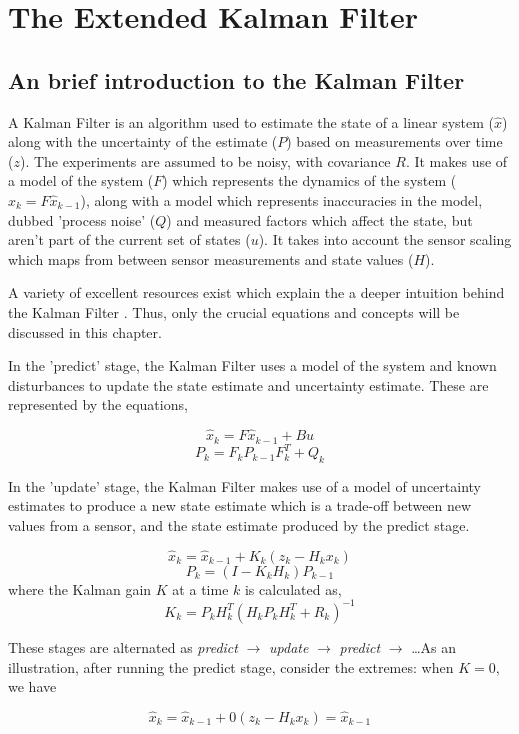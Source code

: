 \section{The Extended Kalman Filter}
\subsection{An brief introduction to the Kalman Filter}
A Kalman Filter \cite{kalman1960new} is an algorithm used to estimate the state of a linear system ($\hat{x}$) along with the uncertainty of the estimate ($P$) based on measurements over time ($z$). The experiments are assumed to be noisy, with covariance $R$. It makes use of a model of the system ($F$) which represents the dynamics of the system ($\hat{x}_{k} = F\hat{x}_{k-1}$), along with a model which represents inaccuracies in the model, dubbed 'process noise' ($Q$) and measured factors which affect the state, but aren't part of the current set of states ($u$). It takes into account the sensor scaling which maps from between sensor measurements and state values ($H$).

A variety of excellent resources exist which explain the a deeper intuition behind the Kalman Filter \cite{website:wlu_kalman_tutorial, website:bzarg_kalman_tutorial}. Thus, only the crucial equations and concepts will be discussed in this chapter.

In the 'predict' stage, the Kalman Filter uses a model of the system and known disturbances to update the state estimate and uncertainty estimate. These are represented by the equations,

\[ \hat{x}_k = F \hat{x}_{k-1} + B u \]
\[ P_k = F_k P_{k-1} F_k^T + Q_k \]

In the 'update' stage, the Kalman Filter makes use of a model of uncertainty estimates to produce a new state estimate which is a trade-off between new values from a sensor, and the state estimate produced by the predict stage.

\[ \hat{x}_k = \hat{x}_{k-1} + K_k (z_k - H_k x_k) \]
\[ P_k = (I - K_k H_k) P_{k-1} \]
where the Kalman gain $K$ at a time $k$ is calculated as,
\[ K_k = P_k H_k^T (H_k P_k H_k^T + R_k)^{-1} \]

These stages are alternated as \emph{predict} $\rightarrow$ \emph{update} $\rightarrow$ \emph{predict} $\rightarrow$ \dots As an illustration, after running the predict stage, consider the extremes: when $K = 0$, we have

\[ \hat{x}_k = \hat{x}_{k-1} + 0 (z_k - H_k x_k) = \hat{x}_{k-1} \]

